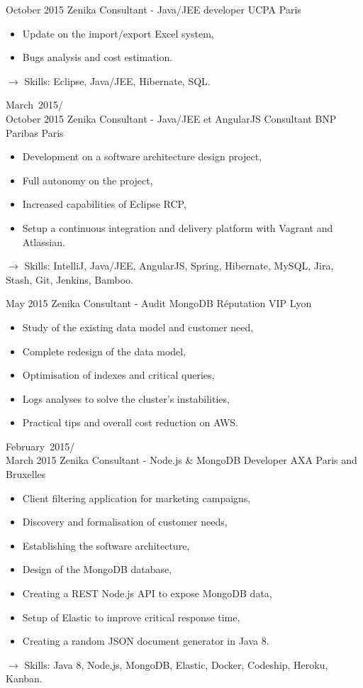 \documentclass[11pt,a4paper]{moderncv}
\begin{document}
\cventry
{October 2015}
{Zenika Consultant - Java/JEE developer}
{UCPA}
{Paris}
{}
{\begin{itemize}
\item Update on the import/export Excel system,
\item Bugs analysis and cost estimation.
\end{itemize}
$\rightarrow$ Skills: Eclipse, Java/JEE, Hibernate, SQL.
}   %

\cventry
{March\ 2015/\\October 2015}
{Zenika Consultant - Java/JEE et AngularJS Consultant}
{BNP Paribas}
{Paris}
{}
{\begin{itemize}
\item Development on a software architecture design project,
\item Full autonomy on the project,
\item Increased capabilities of Eclipse RCP,
\item Setup a continuous integration and delivery platform with Vagrant and Atlassian.
\end{itemize}
$\rightarrow$ Skills: IntelliJ, Java/JEE, AngularJS, Spring, Hibernate, MySQL, Jira, Stash, Git, Jenkins, Bamboo.
}   %

\cventry
{May 2015}
{Zenika Consultant - Audit MongoDB}
{Réputation VIP}
{Lyon}
{}
{\begin{itemize}
\item Study of the existing data model and customer need,
\item Complete redesign of the data model,
\item Optimisation of indexes and critical queries,
\item Logs analyses to solve the cluster's instabilities,
\item Practical tips and overall cost reduction on AWS.
\end{itemize}
}   %

\cventry
{February\ 2015/\\March 2015}
{Zenika Consultant - Node.js \& MongoDB Developer}
{AXA}
{Paris and Bruxelles}
{}
{\begin{itemize}
\item Client filtering application for marketing campaigns,
\item Discovery and formalisation of customer needs,
\item Establishing the software architecture,
\item Design of the MongoDB database,
\item Creating a REST Node.js API to expose MongoDB data,
\item Setup of Elastic to improve critical response time,
\item Creating a random JSON document generator in Java 8.
\end{itemize}
$\rightarrow$ Skills: Java 8, Node.js, MongoDB, Elastic, Docker, Codeship, Heroku, Kanban.
}   %
\end{document}
